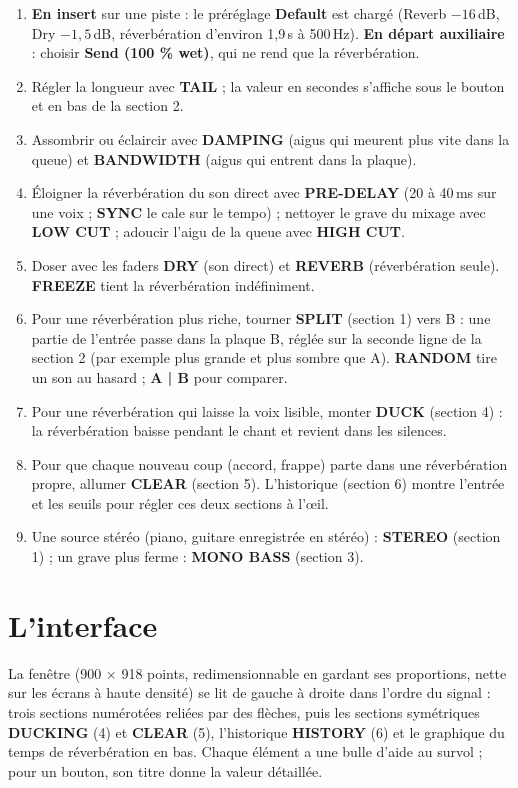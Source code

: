 \documentclass[a4paper,11pt]{article}
\newcommand{\ctl}[1]{\textsf{\textbf{#1}}}   %
\newcommand{\dB}{\,dB}
\begin{document}
\begin{enumerate}
\item \textbf{En insert} sur une piste : le préréglage \ctl{Default} est chargé (Reverb $-16$\dB,
  Dry $-1{,}5$\dB, réverbération d'environ 1,9\,s à 500\,Hz). \textbf{En départ auxiliaire} : choisir
  \ctl{Send (100 \% wet)}, qui ne rend que la réverbération.
\item Régler la longueur avec \ctl{TAIL} ; la valeur en secondes s'affiche sous le bouton et
  en bas de la section 2.
\item Assombrir ou éclaircir avec \ctl{DAMPING} (aigus qui meurent plus vite dans la queue) et
  \ctl{BANDWIDTH} (aigus qui entrent dans la plaque).
\item Éloigner la réverbération du son direct avec \ctl{PRE-DELAY} (20 à 40\,ms sur une voix ;
  \ctl{SYNC} le cale sur le tempo) ;
  nettoyer le grave du mixage avec \ctl{LOW CUT} ; adoucir l'aigu de la queue avec
  \ctl{HIGH CUT}.
\item Doser avec les faders \ctl{DRY} (son direct) et \ctl{REVERB} (réverbération seule). \ctl{FREEZE} tient la réverbération indéfiniment.
\item Pour une réverbération plus riche, tourner \ctl{SPLIT} (section 1) vers B : une partie de
  l'entrée passe dans la plaque B, réglée sur la seconde ligne de la section 2 (par exemple plus
  grande et plus sombre que A). \ctl{RANDOM} tire un son au hasard ; \ctl{A | B} pour comparer.
\item Pour une réverbération qui laisse la voix lisible, monter \ctl{DUCK} (section 4) : la
  réverbération baisse pendant le chant et revient dans les silences.
\item Pour que chaque nouveau coup (accord, frappe) parte dans une réverbération propre,
  allumer \ctl{CLEAR} (section 5). L'historique (section 6) montre l'entrée et les seuils pour
  régler ces deux sections à l'œil.
\item Une source stéréo (piano, guitare enregistrée en stéréo) : \ctl{STEREO} (section 1) ;
  un grave plus ferme : \ctl{MONO BASS} (section 3).
\end{enumerate}

\section{L'interface}

La fenêtre (900 × 918 points, redimensionnable en gardant ses proportions, nette sur les écrans à
haute densité) se lit de gauche à droite dans l'ordre du signal : trois sections numérotées
reliées par des flèches, puis les sections symétriques \ctl{DUCKING} (4) et \ctl{CLEAR} (5),
l'historique
\ctl{HISTORY} (6) et le graphique du temps de réverbération en bas. Chaque élément a une
bulle d'aide au survol ; pour un bouton, son titre donne la valeur détaillée.
\end{document}
